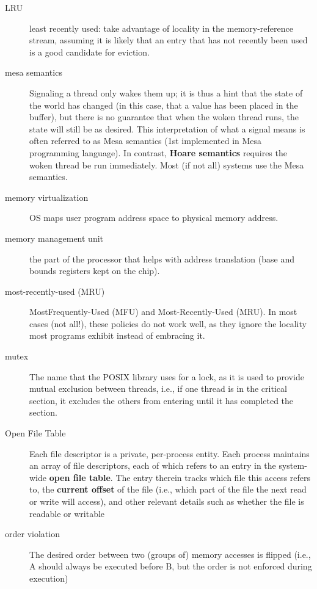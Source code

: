 \begin{description}
\item[LRU] least recently used: take advantage of locality in the memory-reference stream, assuming it is likely that an entry that has not recently been used is a good
candidate for eviction.

\item[mesa semantics] Signaling a thread only wakes them up; it is thus a hint that the state of the world has changed (in this case, that a value has been placed in the buffer), but there is no guarantee that when the woken thread runs, the state will still be as desired. This interpretation of what a signal means is often referred to as Mesa semantics (1st implemented in Mesa programming language). In contrast, \textbf{Hoare semantics} requires the woken thread be run immediately.  Most (if not all) systems use the Mesa semantics.

\item[memory virtualization] OS maps user program address space to physical memory address.

\item[memory management unit] the part of the processor that helps with address translation (base and bounds registers kept on the chip).

\item[most-recently-used (MRU)] MostFrequently-Used (MFU) and Most-Recently-Used (MRU). In most cases (not all!), these policies do not work well, as they ignore the locality most programs exhibit instead of embracing it.

\item[mutex] The name that the POSIX library uses for a lock, as it is used to provide mutual exclusion between threads, i.e., if one thread is in the critical section, it excludes the others from entering until it has completed the section.

\item[Open File Table] Each file descriptor is a private, per-process entity. Each process maintains an array of file descriptors, each of which refers to an entry in the system-wide \textbf{open file table}. The entry therein tracks which file this access refers to, the \textbf{current offset} of the file (i.e., which part of the file the next read or write will access), and other relevant details such as whether the file is readable or writable

\item[order violation] The desired order between two (groups of) memory accesses is flipped (i.e., A should always be executed before B, but the order is not enforced during execution)


\end{description}

